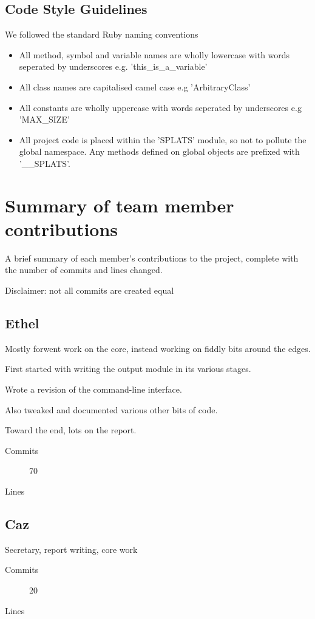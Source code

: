   \subsection{Code Style Guidelines}
  We followed the standard Ruby naming conventions
    \begin{itemize}
      \item All method, symbol and variable names are wholly lowercase with words seperated by underscores e.g. 'this\_is\_a\_variable'
      \item All class names are capitalised camel case e.g 'ArbitraryClass'
      \item All constants are wholly uppercase with words seperated by underscores e.g 'MAX\_SIZE'
      \item All project code is placed within the 'SPLATS' module, so not to
pollute the global namespace. Any methods defined on global
objects are prefixed with '\_\_SPLATS'.
    \end{itemize}


\section{Summary of team member contributions}
  A brief summary of each member's contributions to the project, complete with the number of commits and lines changed.

  Disclaimer: not all commits are created equal

  \subsection{Ethel}
    Mostly forwent work on the core, instead working on fiddly bits around the edges.

    First started with writing the output module in its various stages.

    Wrote a revision of the command-line interface.

    Also tweaked and documented various other bits of code.

    Toward the end, lots on the report.
    \begin{description}
      \item[Commits] 70
      \item[Lines]
    \end{description}

  \subsection{Caz}
    Secretary, report writing, core work
    \begin{description}
      \item[Commits] 20
      \item[Lines]
    \end{description}

